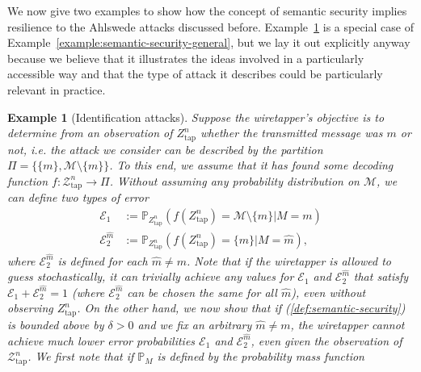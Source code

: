\documentclass[journal]{IEEEtran}
\newcommand{\lemmaconst}{\delta}
\newcommand{\channelOut}{Z}
\newcommand{\channelOutAlph}{\mathcal{Z}}
\newcommand{\channelOutAlphWiretapper}{\channelOutAlph_\mathrm{tap}}
\newcommand{\channelOutWiretapper}{\channelOut_\mathrm{tap}}
\newcommand{\codebookBlocklength}{n}
\newcommand{\Probability}{\mathbb{P}}
\newcommand{\errorprob}{\mathcal{E}}
\newcommand{\messageRV}{M}
\newcommand{\messageAlphabet}{\mathcal{M}}
\newcommand{\messageAlphabetElement}{m}
\newcommand{\partition}{{\Pi}}
\newcommand{\wiretapperDecoder}{{f}}
\newtheorem{example}{Example}
\begin{document}
We now give two examples to show how the concept of semantic security implies resilience to the Ahlswede attacks discussed before. Example~\ref{example:semantic-security-id} is a special case of Example~\ref{example:semantic-security-general}, but we lay it out explicitly anyway because we believe that it illustrates the ideas involved in a particularly accessible way and that the type of attack it describes could be particularly relevant in practice.
\begin{example}[Identification attacks]
\label{example:semantic-security-id}
Suppose the wiretapper's objective is to determine from an observation of $\channelOutWiretapper^\codebookBlocklength$ whether the transmitted message was $\messageAlphabetElement$ or not, i.e. the attack we consider can be described by the partition $\partition = \{\{\messageAlphabetElement\}, \messageAlphabet \setminus \{\messageAlphabetElement\}\}$. To this end, we assume that it has found some decoding function $\wiretapperDecoder: \channelOutAlphWiretapper^\codebookBlocklength \rightarrow \partition$. Without assuming any probability distribution on $\messageAlphabet$, we can define two types of error
\begin{align*}
\errorprob_1
&:=
\Probability_{\channelOutWiretapper^\codebookBlocklength} \left(
  \wiretapperDecoder(\channelOutWiretapper^\codebookBlocklength) = \messageAlphabet \setminus \{\messageAlphabetElement\}
  \big|
  \messageRV = \messageAlphabetElement
\right)
\\
\errorprob_2^{\hat{\messageAlphabetElement}}
&:=
\Probability_{\channelOutWiretapper^\codebookBlocklength} \left(
  \wiretapperDecoder(\channelOutWiretapper^\codebookBlocklength) = \{\messageAlphabetElement\}
  \big|
  \messageRV = \hat{\messageAlphabetElement}
\right),
\end{align*}
where $\errorprob_2^{\hat{\messageAlphabetElement}}$ is defined for each $\hat{\messageAlphabetElement} \neq \messageAlphabetElement$. Note that if the wiretapper is allowed to guess stochastically, it can trivially achieve any values for $\errorprob_1$ and $\errorprob_2^{\hat{\messageAlphabetElement}}$ that satisfy $\errorprob_1 + \errorprob_2^{\hat{\messageAlphabetElement}} = 1$ (where $\errorprob_2^{\hat{\messageAlphabetElement}}$ can be chosen the same for all $\hat{\messageAlphabetElement}$), even without observing $\channelOutWiretapper^\codebookBlocklength$. On the other hand, we now show that if (\ref{def:semantic-security}) is bounded above by $\lemmaconst > 0$ and we fix an arbitrary $\hat{\messageAlphabetElement} \neq \messageAlphabetElement$, the wiretapper cannot achieve much lower error probabilities $\errorprob_1$ and $\errorprob_2^{\hat{\messageAlphabetElement}}$, even given the observation of $\channelOutAlphWiretapper^\codebookBlocklength$. We first note that if $\Probability_\messageRV$ is defined by the probability mass function

\end{example}
\end{document}
